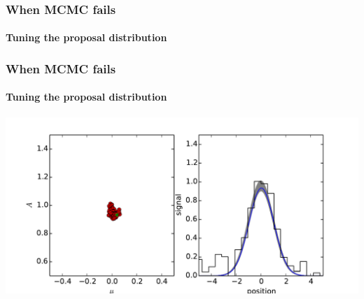 \documentclass[]{beamer}
\begin{document}
\begin{frame}
  \frametitle{When MCMC fails} 
  \framesubtitle{Tuning the proposal distribution} 
\end{frame}
\begin{frame}
  \frametitle{When MCMC fails} 
  \framesubtitle{Tuning the proposal distribution} 
  \includegraphics[width=\textwidth]{movies/MCMC_proposal_1.pdf}
\end{frame}
\end{document}
